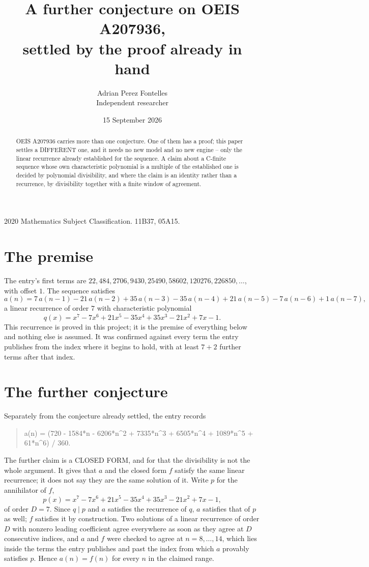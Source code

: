 \documentclass[11pt,a4paper]{article}
\title{A further conjecture on OEIS A207936,\\ \large settled by the proof already in hand}
\author{Adrian Perez Fontelles\\ \small Independent researcher}
\date{15 September 2026}
\theoremstyle{plain}
\theoremstyle{definition}
\begin{document}
\maketitle

\begin{abstract}
OEIS A207936 carries more than one conjecture. One of them has a proof; this paper settles a
DIFFERENT one, and it needs no new model and no new engine -- only the linear recurrence already
established for the sequence. A claim about a C-finite sequence whose own characteristic
polynomial is a multiple of the established one is decided by polynomial divisibility, and where
the claim is an identity rather than a recurrence, by divisibility together with a finite window
of agreement.
\end{abstract}

\noindent\small 2020 Mathematics Subject Classification. 11B37, 05A15.\normalsize

\section{The premise}

The entry's first terms are $22, 484, 2706, 9430, 25490, 58602, 120276, 226850,\dots$, with offset $1$. The sequence satisfies
\[
  a(n)=7\,a(n-1) - 21\,a(n-2) + 35\,a(n-3) - 35\,a(n-4) + 21\,a(n-5) - 7\,a(n-6) + 1\,a(n-7) ,
\]
a linear recurrence of order $7$ with characteristic polynomial
\[
  q(x)=x^{7} - 7 x^{6} + 21 x^{5} - 35 x^{4} + 35 x^{3} - 21 x^{2} + 7 x - 1 .
\]
This recurrence is proved in this project; it is the premise of everything below and nothing else is assumed.
It was confirmed against every term the entry publishes from the index where it begins to hold,
with at least $7+2$ further terms after that index.

\section{The further conjecture}

Separately from the conjecture already settled, the entry records

\begin{quote}\raggedright a(n) = (720 - 1584*n - 6206*n\^{}2 + 7335*n\^{}3 + 6505*n\^{}4 + 1089*n\^{}5 + 61*n\^{}6) / 360.\end{quote}

The further claim is a CLOSED FORM, and for that the divisibility is not the whole argument. It
gives that $a$ and the closed form $f$ satisfy the same linear recurrence; it does not say they
are the same solution of it. Write $p$ for the annihilator of $f$,
\[
  p(x)=x^{7} - 7 x^{6} + 21 x^{5} - 35 x^{4} + 35 x^{3} - 21 x^{2} + 7 x - 1 ,
\]
of order $D=7$. Since $q\mid p$ and $a$ satisfies the recurrence of $q$, $a$ satisfies that of
$p$ as well; $f$ satisfies it by construction. Two solutions of a linear recurrence of order $D$
with nonzero leading coefficient agree everywhere as soon as they agree at $D$ consecutive
indices, and $a$ and $f$ were checked to agree at $n=8,\dots,14$,
which lies inside the terms the entry publishes and past the index from which $a$ provably
satisfies $p$. Hence $a(n)=f(n)$ for every $n$ in the claimed range.
\end{document}
